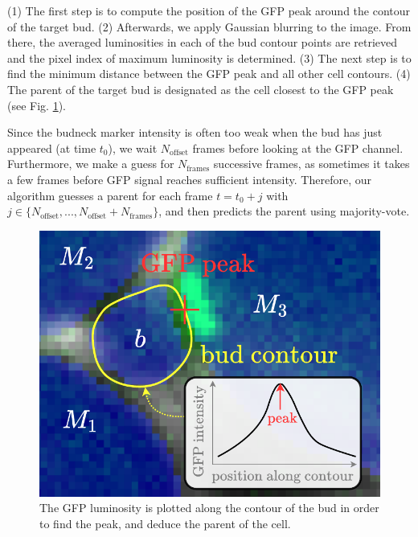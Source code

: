 \documentclass{TP}
\begin{document}


(1) The first step is to compute the position of the GFP peak around the contour of the target bud. (2) Afterwards, we apply Gaussian blurring to the image. From there, the averaged luminosities in each of the bud contour points are retrieved and the pixel index of maximum luminosity is determined. (3) The next step is to find the minimum distance between the GFP peak and all other cell contours. (4) The parent of the target bud is designated as the cell closest to the GFP peak (see Fig. \ref{fig: gfp}). 

Since the budneck marker intensity is often too weak when the bud has just appeared (at time $t_0$), we wait $N_{\text{offset}}$ frames before looking at the GFP channel. Furthermore, we make a guess for $N_{\text{frames}}$ successive frames, as sometimes it takes a few frames before GFP signal reaches sufficient intensity. Therefore, our algorithm guesses a parent for each frame $t = t_0 + j$ with $j \in \{ N_{\text{offset}},...,N_{\text{offset}} + N_{\text{frames}}\}$, and then predicts the parent using majority-vote.

\begin{figure}[h]
\centering
\includegraphics[width=1\linewidth]{Schemas et illustrations/fa.pdf}
\captionsetup{justification=raggedright}
\caption{The GFP luminosity is plotted along the contour of the bud in order to find the peak, and deduce the parent of the cell.}
\label{fig: gfp}
\end{figure}
\end{document}

